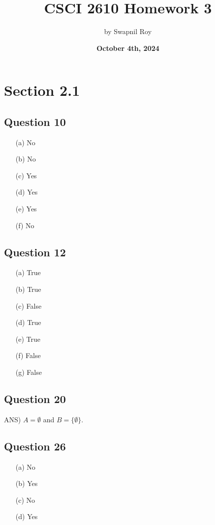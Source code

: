 \documentclass{article}
\title{\textbf{CSCI 2610 Homework 3}}
\date{\textbf{October 4th, 2024}}
\author{by Swapnil Roy}
\begin{document}
\maketitle
\raggedright

\section*{Section 2.1}

\subsection*{Question 10}
\begin{itemize}
    \item[(a)] No
    \item[(b)] No
    \item[(c)] Yes
    \item[(d)] Yes
    \item[(e)] Yes
    \item[(f)] No
\end{itemize}

\subsection*{Question 12}
\begin{itemize}
    \item[(a)] True
    \item[(b)] True
    \item[(c)] False
    \item[(d)] True
    \item[(e)] True
    \item[(f)] False
    \item[(g)] False
\end{itemize}

\subsection*{Question 20}
ANS) \( A = \emptyset \) and \( B = \{\emptyset\} \).


\subsection*{Question 26}
\begin{itemize}
    \item[(a)] No
    \item[(b)] Yes
    \item[(c)] No
    \item[(d)] Yes
\end{itemize}
\end{document}
